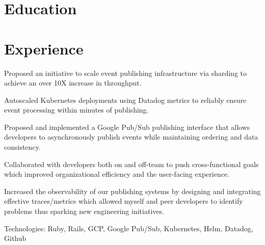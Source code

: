 \documentclass[]{deedy-resume-openfont}
\begin{document}
%
%
\lastupdated

%
%

\section{Education} 




\section{Experience}
\qquad \quad {}
\begin{tightemize}
    \item Proposed an initiative to scale event publishing infrastructure 
    via sharding to achieve an over 10X increase in throughput.
    \item Autoscaled Kubernetes deployments using Datadog metrics to reliably 
    ensure event processing within minutes of publishing.
    \item Proposed and implemented a Google Pub/Sub publishing interface that allows 
    developers to asynchronously publish events while maintaining ordering and data 
    consistency.
    \item Collaborated with developers both on and off-team to push cross-functional goals 
    which improved organizational efficiency and the user-facing experience.
    \item Increased the observability of our publishing systems by designing and integrating effective traces/metrics  
    which allowed myself and peer developers to identify problems thus sparking new engineering initiatives.
    \item Technologies: Ruby, Rails, GCP, Google Pub/Sub, Kubernetes, Helm, Datadog, Github
    \end{tightemize}
\sectionsep
\end{document}
